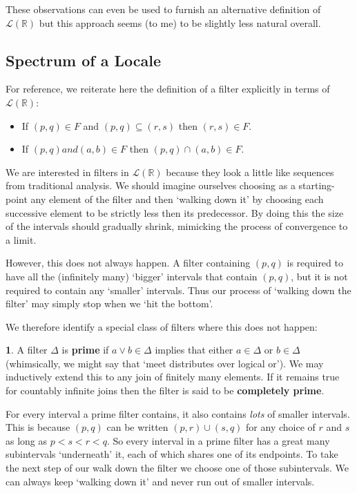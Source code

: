 \documentclass[oneside,english]{amsbook}
\numberwithin{section}{chapter}
\theoremstyle{plain}
\theoremstyle{definition}
\newtheorem{defn}[thm]{\protect\definitionname}
\providecommand{\definitionname}{Definition}
\begin{document}
These observations can even be used to furnish an alternative definition of $\mathscr{L}(\mathbb{R})$ but this approach seems (to me) to be slightly less natural overall.



\subsection{Spectrum of a Locale} 

For reference, we reiterate here the definition of a filter explicitly in terms of $\mathscr{L}(\mathbb{R})$:
\begin{itemize} 
	\item If $(p, q)\in F$ and $(p, q)\subseteq (r, s)$ then $(r, s)\in F$. 
	\item If $(p, q) and (a, b)\in F$ then $(p, q)\cap (a, b)\in F$. 
\end{itemize}


We are interested in filters in $\mathscr{L}(\mathbb{R})$ because they look a little like sequences from traditional analysis. We should imagine ourselves choosing as a starting-point any element of the filter and then `walking down it' by choosing each successive element to be strictly less then its predecessor. By doing this the size of the intervals should gradually shrink, mimicking the process of convergence to a limit.

However, this does not always happen. A filter containing $(p, q)$ is required to have all the (infinitely many) `bigger' intervals that contain $(p, q)$, but it is not required to contain any `smaller' intervals. Thus our process of `walking down the filter' may simply stop when we `hit the bottom'.

We therefore identify a special class of filters where this does not happen:

\begin{defn}
	A filter $\Delta$ is \textbf{prime} if $a\lor b \in \Delta$ implies that either $a\in \Delta$ or $b\in \Delta$ (whimsically, we might say that `meet distributes over logical or'). We may inductively extend this to any join of finitely many elements. If it remains true for countably infinite joins then the filter is said to be \textbf{completely prime}.
\end{defn}

For every interval a prime filter contains, it also contains \emph{lots} of smaller intervals. This is because $(p, q)$ can be written $(p, r)\cup (s, q)$ for any choice of $r$ and $s$ as long as $p<s<r<q$. So every interval in a prime filter has a great many subintervals `underneath' it, each of which shares one of its endpoints. To take the next step of our walk down the filter we choose one of those subintervals. We can always keep `walking down it' and never run out of smaller intervals.
\end{document}

